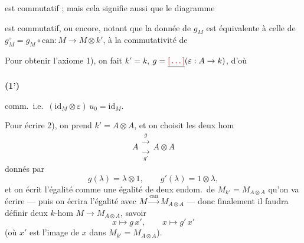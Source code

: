 \documentclass[11pt,a4paper]{article}
\begin{document}
est commutatif ; mais cela signifie aussi que le diagramme


est commutatif, ou encore, notant que la donnée de $g_M$ est équivalente à celle de $g_M^{\circ} = g_M \circ \mathrm{can} : M \to M \otimes k'$, à la  commutativité de


Pour obtenir l'axiome 1), on fait $k' = k$, $g = \struck{\ill{}}(\varepsilon : A \to k)$, d'où

\textbf{(1')}


comm.\ i.e.\ $(\mathrm{id}_M \otimes \varepsilon)\, u_0 = \mathrm{id}_M$.

Pour écrire 2), on  prend $k' = A \otimes A$, et on choisit les deux hom
\[
  A \mathrel{\substack{\xrightarrow{\ g\ } \\ \xrightarrow[\ g'\ ]{}}} A \otimes A
\]
\struck{\ill{}} donnés par
\[
  g(\lambda) = \lambda \otimes 1, \qquad g'(\lambda) = 1 \otimes \lambda ,
\]
et on écrit l'égalité comme une égalité de deux endom.\ de  $M_{k'} = M_{A\otimes A}$ qu'on va écrire --- puis on écrira l'égalité  avec $M \xrightarrow{\mathrm{can}} M_{A\otimes A}$ --- donc finalement il faudra définir deux $k$-hom $M \to M_{A \otimes A}$, savoir
\[
  x \longmapsto g\,x', \qquad x \longmapsto g'\,x'
\]
(où $x'$ est l'image de $x$ dans $M_{k'} = M_{A\otimes A}$).
\end{document}
